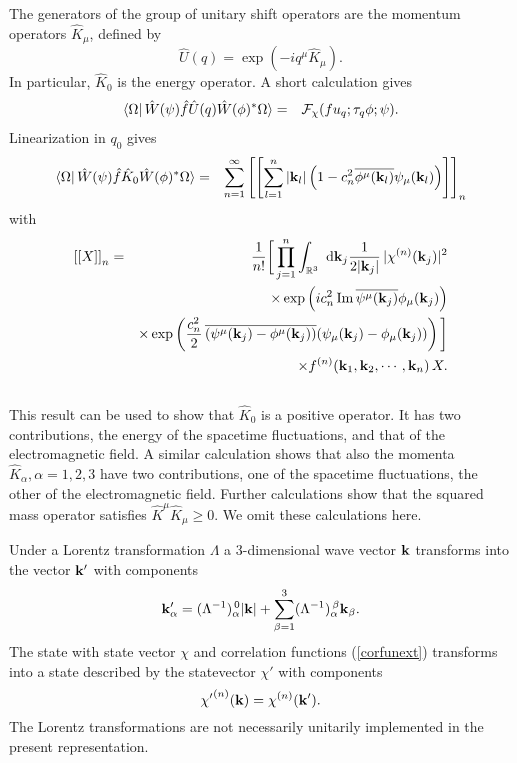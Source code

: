 \documentclass[12pt,a4paper]{article}
\def\Ro{{\mathbb R}}
\def\kk{{\bf k}}
\renewcommand{\Im}{\,{\rm Im}\,}
\begin{document}
The generators of the group of unitary shift operators are the
momentum operators $\hat K_\mu$, defined by
\begin{equation}
\hat U(q)=\exp(-iq^\mu\hat K_\mu).
\label{defgenshift}
\end{equation}
In particular, $\hat K_0$ is the energy operator.
A short calculation gives
\begin{eqnarray}
\langle\Omega|\,\hat W(\psi)\hat f \hat U(q)\hat W(\phi)^*\Omega\rangle
&=&{\cal F}_\chi(fu_{q};\tau_q\phi;\psi).
\end{eqnarray}
Linearization in $q_0$ gives
\begin{eqnarray}
\langle\Omega|\,\hat W(\psi)\hat f \hat K_0\hat W(\phi)^*\Omega\rangle
&=&\sum_{n=1}^\infty
\left[\left[
\sum_{l=1}^n|\kk_l|
\left(1-c_n^2\overline{\phi^\mu(\kk_l)}\psi_\mu(\kk_l)\right)
\right]\right]_n
\end{eqnarray}
with
\begin{eqnarray}
\left[\left[
X\right]\right]_n
&=&
\frac{1}{n!}\bigg[\prod_{j=1}^n\int_{\Ro^3}\hbox{ d}\kk_j
\frac{1}{2|\kk_j|}\,|\chi^{(n)}(\kk_j)|^2\cr
& &\times
\exp\left(ic_n^2\Im\overline{ \psi^\mu(\kk_j)}\phi_\mu(\kk_j)
\right)\cr
& &\times\exp\left(
\frac{c_n^2}{2}\,\overline{( \psi^\mu(\kk_j)-\phi^\mu(\kk_j))}
(\psi_\mu(\kk_j)-\phi_\mu(\kk_j))
\right)
\bigg]\cr
& &\times f^{(n)}(\kk_1,\kk_2,\cdots,\kk_n)
\,X.\cr
& &
\end{eqnarray}
This result can be used to show that $\hat K_0$ is a positive operator.
It has two contributions, the energy of the spacetime fluctuations,
and that of the electromagnetic field.
A similar calculation shows that also the momenta $\hat K_\alpha,\alpha=1,2,3$
have two contributions,
one of the spacetime fluctuations, the other of the electromagnetic field.
Further calculations show that the squared mass operator satisfies
$\hat K^\mu \hat K_\mu\ge 0$. We omit these calculations here.

Under a Lorentz transformation $\Lambda$ a 3-dimensional wave vector $\kk$
transforms into the vector $\kk'$ with components
\begin{equation}
\kk'_\alpha=(\Lambda^{-1})_\alpha^{\,0}|\kk|
+\sum_{\beta=1}^3(\Lambda^{-1})_\alpha^{\,\beta}\kk_\beta.
\end{equation}
The state with state vector $\chi$ and correlation functions (\ref{corfunext}) transforms
into a state described by the statevector $\chi'$ with components
\begin{equation}
{\chi'}^{(n)}(\kk)=\chi^{(n)}(\kk').
\end{equation}
The Lorentz transformations are not necessarily unitarily implemented
in the present representation.
\end{document}
